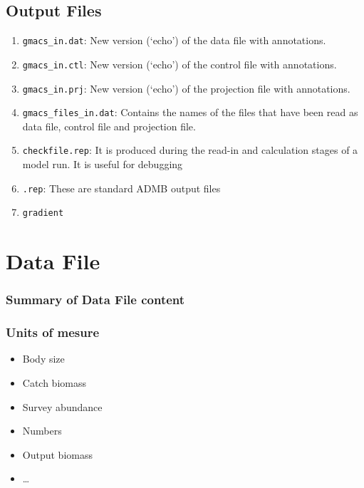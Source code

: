\documentclass[
]{book}
\providecommand{\tightlist}{%
  \setlength{\itemsep}{0pt}\setlength{\parskip}{0pt}}
\begin{document}
\hypertarget{output-files}{%
\section{Output Files}\label{output-files}}

\begin{enumerate}
\def\labelenumi{\arabic{enumi}.}
\tightlist
\item
  \texttt{gmacs\_in.dat}: New version (`echo') of the data file with annotations.
\item
  \texttt{gmacs\_in.ctl}: New version (`echo') of the control file with annotations.
\item
  \texttt{gmacs\_in.prj}: New version (`echo') of the projection file with annotations.
\item
  \texttt{gmacs\_files\_in.dat}: Contains the names of the files that have been read as data file, control file and projection file.
\item
  \texttt{checkfile.rep}: It is produced during the read-in and calculation stages of a model run. It is useful for debugging
\item
  \texttt{.rep}: These are standard ADMB output files
\item
  \texttt{gradient}
\end{enumerate}

\hypertarget{data-file}{%
\chapter{Data File}\label{data-file}}

\hypertarget{summary-of-data-file-content}{%
\subsection{Summary of Data File content}\label{summary-of-data-file-content}}

\hypertarget{units-of-mesure}{%
\subsection{Units of mesure}\label{units-of-mesure}}

\begin{itemize}
\tightlist
\item
  Body size
\item
  Catch biomass
\item
  Survey abundance
\item
  Numbers
\item
  Output biomass
\item
  \ldots{}
\end{itemize}
\end{document}

